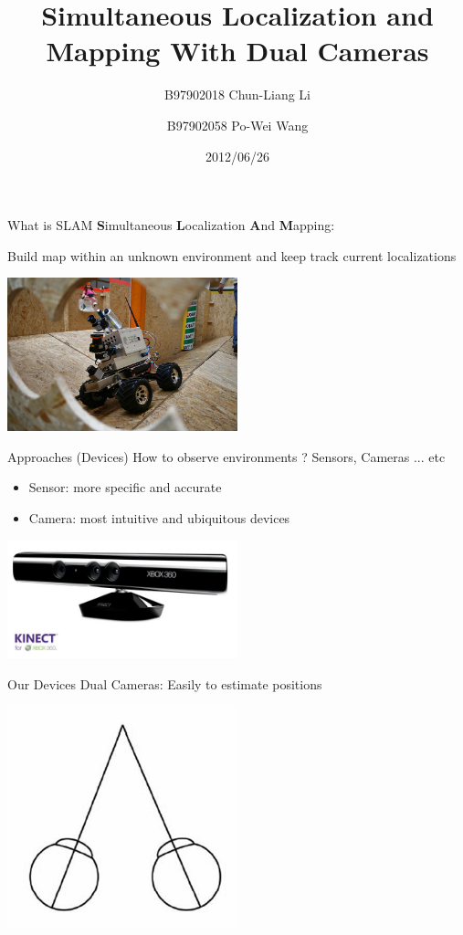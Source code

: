 \documentclass{beamer}
\title{Simultaneous Localization and Mapping With Dual Cameras}
\author{B97902018 Chun-Liang Li \and 
	B97902058 Po-Wei Wang}
\date{2012/06/26}
\begin{document}
	\begin{frame}
		\titlepage
	\end{frame}

	\begin{frame}{What is SLAM}
		\textbf{S}imultaneous \textbf{L}ocalization \textbf{A}nd \textbf{M}apping: 
		
		Build map within an unknown environment and keep track current localizations
		\begin{center}
			\includegraphics[width=0.5\textwidth]{./pics/robot.jpg} 
		\end{center}
	\end{frame}

	\begin{frame}{ Approaches (Devices) }
		How to observe environments ? Sensors, Cameras ... etc\\
		\begin{itemize}
			\item Sensor: more specific and accurate
			\item Camera: most intuitive and ubiquitous devices
		\end{itemize}
		\begin{center}
			\includegraphics[width=0.5\textwidth]{./pics/sensor.jpg} 
		\end{center}
	\end{frame}
	
	\begin{frame}{Our Devices}
			Dual Cameras: Easily to estimate positions
			\begin{center}
				\includegraphics[width=0.5\textwidth]{./pics/dual.jpg} 
			\end{center}
	\end{frame}
\end{document}
